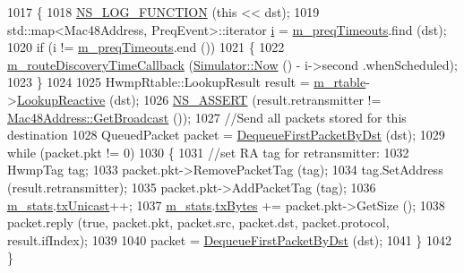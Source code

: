 \begin{DoxyCode}
1017 \{
1018   \hyperlink{log-macros-disabled_8h_a90b90d5bad1f39cb1b64923ea94c0761}{NS\_LOG\_FUNCTION} (\textcolor{keyword}{this} << dst);
1019   std::map<Mac48Address, PreqEvent>::iterator \hyperlink{bernuolliDistribution_8m_a6f6ccfcf58b31cb6412107d9d5281426}{i} = \hyperlink{classns3_1_1dot11s_1_1HwmpProtocol_a8965b53a5ae63807e2bcf0faaa4a6dc2}{m\_preqTimeouts}.find (dst);
1020   \textcolor{keywordflow}{if} (i != \hyperlink{classns3_1_1dot11s_1_1HwmpProtocol_a8965b53a5ae63807e2bcf0faaa4a6dc2}{m\_preqTimeouts}.end ())
1021     \{
1022       \hyperlink{classns3_1_1dot11s_1_1HwmpProtocol_a748b1b4837d4ec8e76852a6c450d2f4e}{m\_routeDiscoveryTimeCallback} (\hyperlink{classns3_1_1Simulator_ac3178fa975b419f7875e7105be122800}{Simulator::Now} () - i->second
      .whenScheduled);
1023     \}
1024 
1025   HwmpRtable::LookupResult result = \hyperlink{classns3_1_1dot11s_1_1HwmpProtocol_a12fda0e3e5a400888c8ba1a87c1a7216}{m\_rtable}->\hyperlink{classns3_1_1dot11s_1_1HwmpRtable_a41a44ed94c1ed4d798f3278ba8db0f1f}{LookupReactive} (dst);
1026   \hyperlink{assert_8h_a6dccdb0de9b252f60088ce281c49d052}{NS\_ASSERT} (result.retransmitter != \hyperlink{classns3_1_1Mac48Address_a55156e302c6bf950c0b558365adbde84}{Mac48Address::GetBroadcast} ());
1027   \textcolor{comment}{//Send all packets stored for this destination}
1028   QueuedPacket packet = \hyperlink{classns3_1_1dot11s_1_1HwmpProtocol_a90618325ad9eb49c63093da0a9b313d9}{DequeueFirstPacketByDst} (dst);
1029   \textcolor{keywordflow}{while} (packet.pkt != 0)
1030     \{
1031       \textcolor{comment}{//set RA tag for retransmitter:}
1032       HwmpTag tag;
1033       packet.pkt->RemovePacketTag (tag);
1034       tag.SetAddress (result.retransmitter);
1035       packet.pkt->AddPacketTag (tag);
1036       \hyperlink{classns3_1_1dot11s_1_1HwmpProtocol_a478a13e7ec9ca167a5b13b38237d17ae}{m\_stats}.\hyperlink{structns3_1_1dot11s_1_1HwmpProtocol_1_1Statistics_a7d9d31219b5c2b3a713ba09ddd43044a}{txUnicast}++;
1037       \hyperlink{classns3_1_1dot11s_1_1HwmpProtocol_a478a13e7ec9ca167a5b13b38237d17ae}{m\_stats}.\hyperlink{structns3_1_1dot11s_1_1HwmpProtocol_1_1Statistics_a507c7a9383e255dd2402d42c8218b416}{txBytes} += packet.pkt->GetSize ();
1038       packet.reply (\textcolor{keyword}{true}, packet.pkt, packet.src, packet.dst, packet.protocol, result.ifIndex);
1039 
1040       packet = \hyperlink{classns3_1_1dot11s_1_1HwmpProtocol_a90618325ad9eb49c63093da0a9b313d9}{DequeueFirstPacketByDst} (dst);
1041     \}
1042 \}
\end{DoxyCode}


